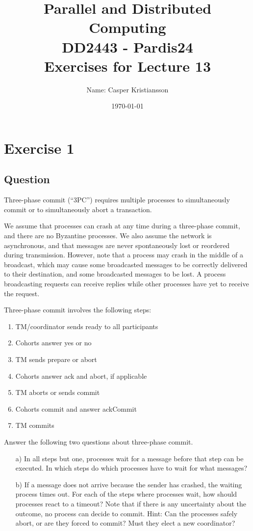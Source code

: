\documentclass{article}
\title{\textbf{Parallel and Distributed Computing\\DD2443 - Pardis24\\Exercises for Lecture 13}}
\author{Name: Casper Kristiansson}
\date{\today}
\begin{document}
\setlength\parindent{0pt}
\setlength{\parskip}{\bigskipamount}

\maketitle
\section*{Exercise 1}
\subsection*{Question}
Three-phase commit (“3PC”) requires multiple processes to simultaneously commit or to simultaneously abort a transaction.

We assume that processes can crash at any time during a three-phase commit, and there are no Byzantine processes. We also assume the network is asynchronous, and that messages are never spontaneously lost or reordered during transmission. However, note that a process may crash in the middle of a broadcast, which may cause some broadcasted messages to be correctly delivered to their destination, and some broadcasted messages to be lost. A process broadcasting requests can receive replies while other processes have yet to receive the request.

Three-phase commit involves the following steps:
\begin{enumerate}
    \item TM/coordinator sends ready to all participants
    \item Cohorts answer yes or no
    \item TM sends prepare or abort
    \item Cohorts answer ack and abort, if applicable
    \item TM aborts or sends commit
    \item Cohorts commit and answer ackCommit
    \item TM commits
\end{enumerate}

Answer the following two questions about three-phase commit.
\begin{enumerate}
    \item[a)] In all steps but one, processes wait for a message before that step can be executed. In which steps do which processes have to wait for what messages?
    \item[b)] If a message does not arrive because the sender has crashed, the waiting process times out. For each of the steps where processes wait, how should processes react to a timeout? Note that if there is any uncertainty about the outcome, no process can decide to commit. Hint: Can the processes safely abort, or are they forced to commit? Must they elect a new coordinator?
\end{enumerate}
\end{document}
